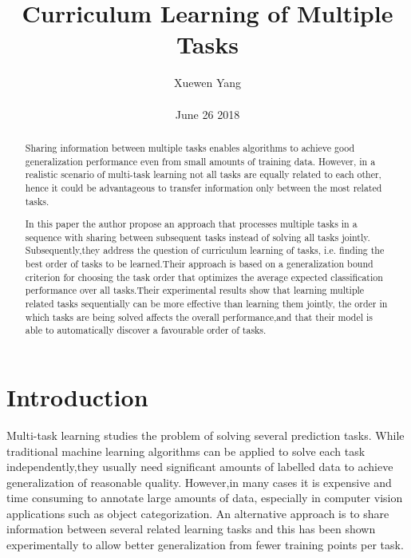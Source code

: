 \documentclass[10pt,twocolumn,letterpaper]{article}
\author{Xuewen Yang\\\\
June 26 2018}
\title{Curriculum Learning of Multiple Tasks}
\begin{document}
\maketitle
\begin{abstract}
Sharing information between multiple tasks enables algorithms to achieve good generalization performance even from small amounts of training data. However, in a realistic scenario of multi-task learning not all tasks are equally related to each other, hence it could be advantageous to transfer information only between the most related tasks.

In this paper the author propose an approach that processes multiple tasks in a sequence with sharing between subsequent tasks instead of solving all tasks jointly. Subsequently,they address the question of curriculum learning of tasks, i.e. finding the best order of tasks to be learned.Their approach is based on a generalization bound criterion for choosing the task order that optimizes the average expected classification performance over all tasks.Their experimental results show that learning multiple related tasks sequentially can be more effective than learning them jointly, the order in which tasks are being solved affects the overall performance,and that their model is able to automatically discover a favourable order of tasks.
\end{abstract}
\section{Introduction}
Multi-task learning\cite{Caruana1997Multitask} studies the problem of solving several prediction tasks. While traditional machine learning algorithms can be applied to solve each task independently,they usually need significant amounts of labelled data to achieve generalization of reasonable quality. However,in many cases it is expensive and time consuming to annotate large amounts of data, especially in computer vision applications such as object categorization. An alternative approach is to share information between several related learning tasks and this has been shown experimentally to allow better generalization from fewer training points per task.
\end{document}
